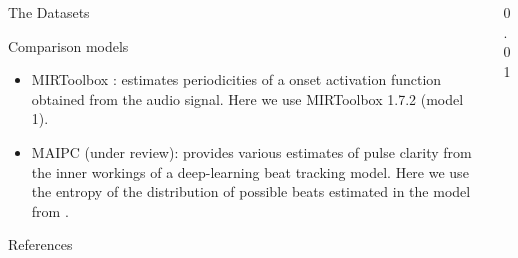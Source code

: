 \documentclass[final]{beamer}
\newlength{\sepwidth}
\newcommand{\separatorcolumn}[1][\sepwidth]{\begin{column}{#1}\end{column}}
\newcommand{\hemph}[1]{{\color{mitred}#1}}
\begin{document}
\begin{frame}[t]
\begin{columns}[T]
\begin{column}{0.93\textwidth}
\begin{column}{0.472\textwidth}
\begin{block}{The Datasets}
{            }
        \end{block}
        \begin{block}{Comparison models}
          {\small
          \begin{itemize}
            \item \hemph{MIRToolbox \citep{lartillot2008matlab}:} estimates
              periodicities of a onset activation function obtained from the audio
              signal. Here we use MIRToolbox 1.7.2 (model 1).
            \item \hemph{MAIPC (under review):} provides various estimates of pulse
              clarity from the inner workings of a deep-learning beat tracking
              model. Here we use the entropy of the distribution of possible
              beats estimated in the model from \cite{krebs2015efficient}.
          \end{itemize}
          }
        \end{block}
        \begin{block}{\normalsize References}
{ \scriptsize

}
        \end{block}
    \end{column}
    \end{column}
    \separatorcolumn[0.01\textwidth]
    \end{columns}


\end{frame}
\end{document}
